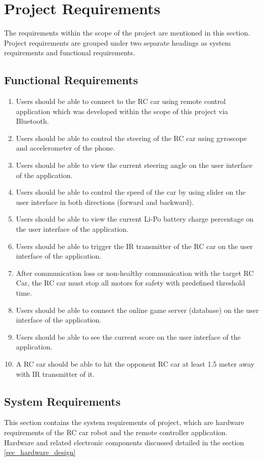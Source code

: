 \section{Project Requirements}
The requirements within the scope of the project are mentioned in this section. Project requirements are grouped under two separate headings as system requirements and functional requirements.

\subsection{Functional Requirements}
\begin{enumerate}
    \item Users should be able to connect to the RC car using remote control application which was developed within the scope of this project via Bluetooth.
    \item Users should be able to control the steering of the RC car using gyroscope and accelerometer of the phone.
    \item Users should be able to view the current steering angle on the user interface of the application.
    \item Users should be able to control the speed of the car by using slider on the user interface in both directions (forward and backward).
    \item Users should be able to view the current Li-Po battery charge percentage on the user interface of the application.
    \item Users should be able to trigger the IR transmitter of the RC car on the user interface of the application.
    \item After communication loss or non-healthy communication with the target RC Car, the RC car must stop all motors for safety with predefined threshold time.
    \item Users should be able to connect the online game server (database) on the user interface of the application.
    \item Users should be able to see the current score on the user interface of the application.
    \item A RC car should be able to hit the opponent RC car at least 1.5 meter away with IR transmitter of it.
\end{enumerate}

\subsection{System Requirements}
This section contains the system requirements of project, which are hardware requirements of the RC car robot and the remote controller application. Hardware and related electronic components discussed detailed in the section \ref{sec_hardware_design}\\

